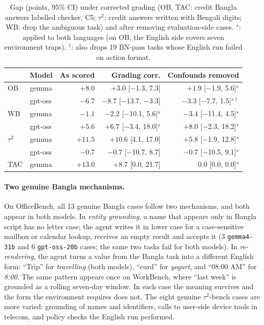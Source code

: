 \documentclass[11pt]{article}
\newcommand{\gemma}{\texttt{gemma4-31b}}
\newcommand{\gptoss}{\texttt{gpt-oss-20b}}
\newcommand{\OB}{OfficeBench}
\newcommand{\WB}{WorkBench}
\newcommand{\TAU}{$\tau^2$-bench}
\begin{document}
\begin{table}[t]
\centering\small
\setlength{\tabcolsep}{8pt}
\begin{tabular}{llrrr}
\toprule
 & Model & As scored & Grading corr. & Confounds removed \\
\midrule
OB & gemma   & $+8.0$  & $+3.0$ [$-$1.3, 7.3]  & $+1.9$ [$-$1.9, 5.6]$^{s}$ \\
   & gpt-oss & $-6.7$  & $-8.7$ [$-$13.7, $-$3.3] & $-3.3$ [$-$7.7, 1.5]$^{s\dagger}$ \\
WB & gemma   & $-1.1$  & $-2.2$ [$-$10.1, 5.6]$^{s}$ & $-3.4$ [$-$11.4, 4.5]$^{s}$ \\
   & gpt-oss & $+5.6$  & $+6.7$ [$-$3.4, 18.0]$^{s}$ & $+8.0$ [$-$2.3, 18.2]$^{s}$ \\
$\tau^2$ & gemma & $+11.5$ & $+10.6$ [4.1, 17.0] & $+5.8$ [$-$1.9, 12.8]$^{s}$ \\
   & gpt-oss & $-0.7$  & $-0.7$ [$-$10.7, 8.7] & $-0.7$ [$-$10.5, 9.1]$^{s}$ \\
TAC & gemma  & $+13.0$ & $+8.7$ [0.0, 21.7]    & $0.0$ [0.0, 0.0]$^{s}$ \\
\bottomrule
\end{tabular}
\caption{Gap (points, 95\% CI) under corrected grading (OB, TAC: credit Bangla answers labelled
checker, C5; $\tau^2$: credit answers written with Bengali digits; WB: drop the ambiguous task) and after
removing evaluation-side cases. $^{s}$: applied to both languages (on OB, the English side covers
seven environment traps). $^{\dagger}$: also drops 19 BN-pass tasks whose English run failed on
action format.}
\label{tab:corrected}
\end{table}

\paragraph{Two genuine Bangla mechanisms.} On \OB{}, all 13 genuine Bangla cases follow two
mechanisms, and both appear in both models. In \emph{entity grounding}, a name that appears only
in Bangla script has no letter case; the agent writes it in lower case for a case-sensitive mailbox
or calendar lookup, receives an empty result and accepts it (3 \gemma{} and 6 \gptoss{} cases;
the same two tasks fail for both models). In \emph{re-rendering}, the agent turns a value from
the Bangla task into a different English form: ``Trip'' for \emph{travelling} (both models),
``curd'' for \emph{yogurt}, and ``08:00 AM'' for \emph{8:00}. The same pattern appears once on
\WB{}, where ``last week'' is grounded as a rolling seven-day window. In each case the meaning
survives and the form the environment requires does not. The eight genuine \TAU{} cases are more
varied: grounding of names and identifiers, calls to user-side device tools in telecom, and policy
checks the English run performed.
\end{document}
